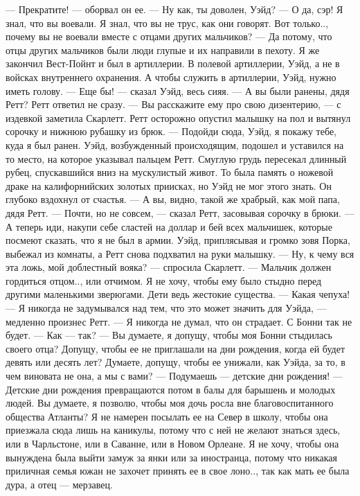 — Прекратите! — оборвал он ее. — Ну как, ты доволен, Уэйд?
— О да, сэр! Я знал, что вы воевали. Я знал, что вы не трус, как они говорят. Вот только.., почему вы не воевали вместе с отцами других мальчиков?
— Да потому, что отцы других мальчиков были люди глупые и их направили в пехоту. Я же закончил Вест-Пойнт и был в артиллерии. В полевой артиллерии, Уэйд, а не в войсках внутреннего охранения. А чтобы служить в артиллерии, Уэйд, нужно иметь голову.
— Еще бы! — сказал Уэйд, весь сияя. — А вы были ранены, дядя Ретт?
Ретт ответил не сразу.
— Вы расскажите ему про свою дизентерию, — с издевкой заметила Скарлетт.
Ретт осторожно опустил малышку на пол и вытянул сорочку и нижнюю рубашку из брюк.
— Подойди сюда, Уэйд, я покажу тебе, куда я был ранен. Уэйд, возбужденный происходящим, подошел и уставился на то место, на которое указывал пальцем Ретт. Смуглую грудь пересекал длинный рубец, спускавшийся вниз на мускулистый живот. То была память о ножевой драке на калифорнийских золотых приисках, но Уэйд не мог этого знать. Он глубоко вздохнул от счастья.
— А вы, видно, такой же храбрый, как мой папа, дядя Ретт.
— Почти, но не совсем, — сказал Ретт, засовывая сорочку в брюки. — А теперь иди, накупи себе сластей на доллар и бей всех мальчишек, которые посмеют сказать, что я не был в армии.
Уэйд, приплясывая и громко зовя Порка, выбежал из комнаты, а Ретт снова подхватил на руки малышку.
— Ну, к чему вся эта ложь, мой доблестный вояка? — спросила Скарлетт.
— Мальчик должен гордиться отцом.., или отчимом. Я не хочу, чтобы ему было стыдно перед другими маленькими зверюгами. Дети ведь жестокие существа.
— Какая чепуха!
— Я никогда не задумывался над тем, что это может значить для Уэйда, — медленно произнес Ретт. — Я никогда не думал, что он страдает. С Бонни так не будет.
— Как — так?
— Вы думаете, я допущу, чтобы моя Бонни стыдилась своего отца? Допущу, чтобы ее не приглашали на дни рождения, когда ей будет девять или десять лет? Думаете, допущу, чтобы ее унижали, как Уэйда, за то, в чем виновата не она, а мы с вами?
— Подумаешь — детские дни рождения!
— Детские дни рождения превращаются потом в балы для барышень и молодых людей. Вы думаете, я позволю, чтобы моя дочь росла вне благовоспитанного общества Атланты? Я не намерен посылать ее на Север в школу, чтобы она приезжала сюда лишь на каникулы, потому что с ней не желают знаться здесь, или в Чарльстоне, или в Саванне, или в Новом Орлеане. Я не хочу, чтобы она вынуждена была выйти замуж за янки или за иностранца, потому что никакая приличная семья южан не захочет принять ее в свое лоно.., так как мать ее была дура, а отец — мерзавец.
